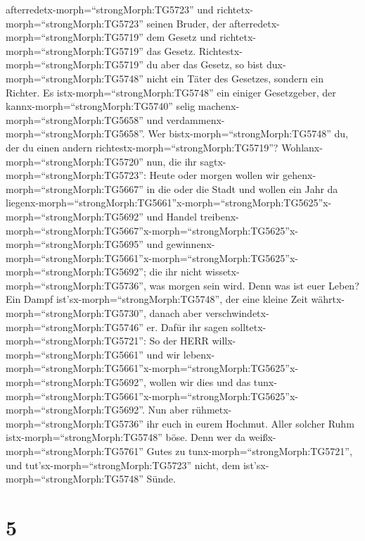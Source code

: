 afterredetx-morph=``strongMorph:TG5723'' und
richtetx-morph=``strongMorph:TG5723'' seinen Bruder, der
afterredetx-morph=``strongMorph:TG5719'' dem Gesetz und
richtetx-morph=``strongMorph:TG5719'' das Gesetz.
Richtestx-morph=``strongMorph:TG5719'' du aber das Gesetz, so bist
dux-morph=``strongMorph:TG5748'' nicht ein Täter des Gesetzes, sondern
ein Richter.  Es istx-morph=``strongMorph:TG5748'' ein
einiger Gesetzgeber, der kannx-morph=``strongMorph:TG5740'' selig
machenx-morph=``strongMorph:TG5658'' und
verdammenx-morph=``strongMorph:TG5658''. Wer
bistx-morph=``strongMorph:TG5748'' du, der du einen andern
richtestx-morph=``strongMorph:TG5719''? 
Wohlanx-morph=``strongMorph:TG5720'' nun, die ihr
sagtx-morph=``strongMorph:TG5723'': Heute oder morgen wollen wir
gehenx-morph=``strongMorph:TG5667'' in die oder die Stadt und wollen ein
Jahr da
liegenx-morph=``strongMorph:TG5661''\textbar x-morph=``strongMorph:TG5625''x-morph=``strongMorph:TG5692''
und Handel
treibenx-morph=``strongMorph:TG5667''\textbar x-morph=``strongMorph:TG5625''x-morph=``strongMorph:TG5695''
und
gewinnenx-morph=``strongMorph:TG5661''\textbar x-morph=``strongMorph:TG5625''x-morph=``strongMorph:TG5692'';
 die ihr nicht wissetx-morph=``strongMorph:TG5736'', was
morgen sein wird. Denn was ist euer Leben? Ein Dampf
ist'sx-morph=``strongMorph:TG5748'', der eine kleine Zeit
währtx-morph=``strongMorph:TG5730'', danach aber
verschwindetx-morph=``strongMorph:TG5746'' er.  Dafür ihr
sagen solltetx-morph=``strongMorph:TG5721'': So der HERR
willx-morph=``strongMorph:TG5661'' und wir
lebenx-morph=``strongMorph:TG5661''\textbar x-morph=``strongMorph:TG5625''x-morph=``strongMorph:TG5692'',
wollen wir dies und das
tunx-morph=``strongMorph:TG5661''\textbar x-morph=``strongMorph:TG5625''x-morph=``strongMorph:TG5692''.
 Nun aber rühmetx-morph=``strongMorph:TG5736'' ihr euch in
eurem Hochmut. Aller solcher Ruhm istx-morph=``strongMorph:TG5748''
böse.  Denn wer da weißx-morph=``strongMorph:TG5761'' Gutes
zu tunx-morph=``strongMorph:TG5721'', und
tut'sx-morph=``strongMorph:TG5723'' nicht, dem
ist'sx-morph=``strongMorph:TG5748'' Sünde.

\hypertarget{section-4}{%
\section{5}\label{section-4}}

